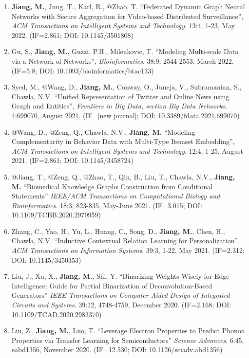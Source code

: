 \documentclass[10pt]{article}
\newenvironment{myindentpar}[1]%
{\begin{list}{}%
         {\setlength{\leftmargin}{#1}}%
         \item[]%
}
{\end{list}}
\newcounter{list}
\begin{document}
\begin{myindentpar}{0.00cm}
\begin{enumerate}[leftmargin=.5cm]
\item[J25] \textbf{Jiang, M.}, Jung, T., Karl, R., @Zhao, T. ``Federated Dynamic Graph Neural Networks with Secure Aggregation for Video-based Distributed Surveillance'', \textit{ACM Transactions on Intelligent Systems and Technology}. 13:4, 1-23, May 2022. (IF=2.861; DOI: 10.1145/3501808)

\item[J24] Gu, S., \textbf{Jiang, M.}, Guzzi, P.H., Milenkovic, T. ``Modeling Multi-scale Data via a Network of Networks'', \textit{Bioinformatics}. 38:9, 2544-2553, March 2022. (IF=5.8; DOI: 10.1093/bioinformatics/btac133)

\item[J23] Syed, M., @Wang, D., \textbf{Jiang, M.}, Conway, O., Juneja, V., Subramanian, S., Chawla, N.V. ``Unified Representation of Twitter and Online News using Graph and Entities'', \textit{Frontiers in Big Data, section Big Data Networks}. 4:699070, August 2021. (IF=[new journal]; DOI: 10.3389/fdata.2021.699070)

\item[J22] @Wang, D., @Zeng, Q., Chawla, N.V., \textbf{Jiang, M.} ``Modeling Complementarity in Behavior Data with Multi-Type Itemset Embedding'', \textit{ACM Transactions on Intelligent Systems and Technology}. 12:4, 1-25, August 2021. (IF=2.861; DOI: 10.1145/3458724)

\item[J21] @Jiang, T., @Zeng, Q., @Zhao, T., Qin, B., Liu, T., Chawla, N.V., \textbf{Jiang, M.} ``Biomedical Knowledge Graphs Construction from Conditional Statements'' \textit{IEEE/ACM Transactions on Computational Biology and Bioinformatics}. 18:3, 823-835, May-June 2021. (IF=3.015; DOI: 10.1109/TCBB.2020.2979959)

\item[J20] Zhang, C., Yao, H., Yu, L., Huang, C., Song, D., \textbf{Jiang, M.}, Chen, H., Chawla, N.V. ``Inductive Contextual Relation Learning for Personalization'', \textit{ACM Transactions on Information Systems}. 39:3, 1-22, May 2021. (IF=2.312; DOI: 10.1145/3450353)

\item[J19] Liu, J., Xu, X., \textbf{Jiang, M.}, Shi, Y. ``Binarizing Weights Wisely for Edge Intelligence: Guide for Partial Binarization of Deconvolution-Based Generators'' \textit{IEEE Transactions on Computer-Aided Design of Integrated Circuits and Systems}. 39:12, 4748-4759, December 2020. (IF=2.168; DOI: 10.1109/TCAD.2020.2983370)

\item[J18] Liu, Z., \textbf{Jiang, M.}, Luo, T. ``Leverage Electron Properties to Predict Phonon Properties via Transfer Learning for Semiconductors'' \textit{Science Advances}. 6:45, eabd1356, November 2020. (IF=12.530; DOI: 10.1126/sciadv.abd1356)
	

\end{enumerate}
\end{myindentpar}
\end{document}
